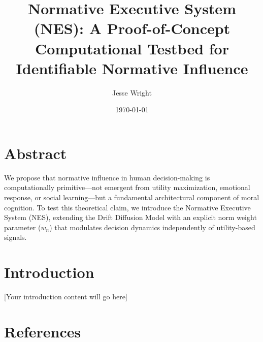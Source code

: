 \documentclass[11pt]{article}
\title{Normative Executive System (NES): A Proof-of-Concept Computational Testbed for Identifiable Normative Influence}
\author{Jesse Wright}
\date{\today}
\begin{document}
\maketitle

\section*{Abstract}
We propose that normative influence in human decision-making is computationally primitive—not emergent from utility maximization, emotional response, or social learning—but a fundamental architectural component of moral cognition. To test this theoretical claim, we introduce the Normative Executive System (NES), extending the Drift Diffusion Model with an explicit norm weight parameter ($w_n$) that modulates decision dynamics independently of utility-based signals.

\section{Introduction}
[Your introduction content will go here]

\section*{References}


\end{document}
